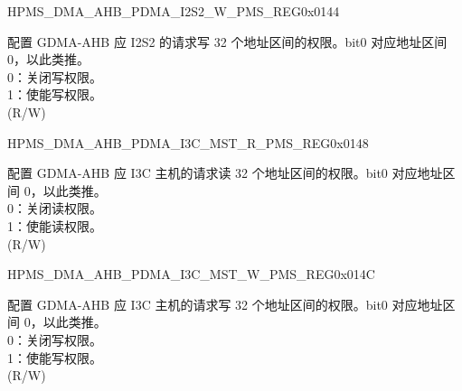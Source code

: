 \begin{register}{H}{PMS\_DMA\_AHB\_PDMA\_I2S2\_W\_PMS\_REG}{0x0144}\label{regdesc:PMSDMAAHBPDMAI2S2WPMSREG}
%
\regnewline%
\begin{regdesc}\begin{reglist}
\label{fielddesc:PMSDMAAHBPDMAI2S2WPMS}\item [PMS\_DMA\_AHB\_PDMA\_I2S2\_W\_PMS] 配置 GDMA-AHB 应 I2S2 的请求写 32 个地址区间的权限。bit0 对应地址区间 0，以此类推。\\
0：关闭写权限。\\
1：使能写权限。\\ (R/W)
\end{reglist}\end{regdesc}
\end{register}


\begin{register}{H}{PMS\_DMA\_AHB\_PDMA\_I3C\_MST\_R\_PMS\_REG}{0x0148}\label{regdesc:PMSDMAAHBPDMAI3CMSTRPMSREG}
%
\regnewline%
\begin{regdesc}\begin{reglist}
\label{fielddesc:PMSDMAAHBPDMAI3CMSTRPMS}\item [PMS\_DMA\_AHB\_PDMA\_I3C\_MST\_R\_PMS] 配置 GDMA-AHB 应 I3C 主机的请求读 32 个地址区间的权限。bit0 对应地址区间 0，以此类推。\\
0：关闭读权限。\\
1：使能读权限。\\ (R/W)
\end{reglist}\end{regdesc}
\end{register}


\begin{register}{H}{PMS\_DMA\_AHB\_PDMA\_I3C\_MST\_W\_PMS\_REG}{0x014C}\label{regdesc:PMSDMAAHBPDMAI3CMSTWPMSREG}
%
\regnewline%
\begin{regdesc}\begin{reglist}
\label{fielddesc:PMSDMAAHBPDMAI3CMSTWPMS}\item [PMS\_DMA\_AHB\_PDMA\_I3C\_MST\_W\_PMS] 配置 GDMA-AHB 应 I3C 主机的请求写 32 个地址区间的权限。bit0 对应地址区间 0，以此类推。\\
0：关闭写权限。\\
1：使能写权限。\\ (R/W)
\end{reglist}\end{regdesc}
\end{register}


